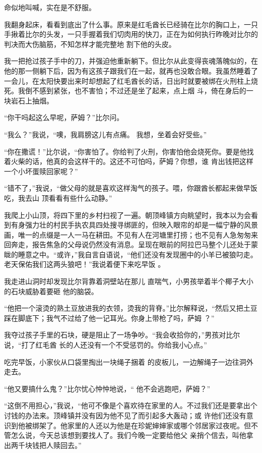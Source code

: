 \documentclass{article}
\begin{document}
命似地叫喊，实在是不舒服。 

我翻身起床，看看到底出了什么事。原来是红毛酋长已经骑在比尔的胸口上，一只手揪着比尔的头发，一只手握着我们切肉用的快刀，正在为如何执行昨晚对比尔的判决而大伤脑筋，不知怎样才能完整地
割下他的头皮。 

我一把抢过孩子手中的刀，并强迫他重新躺下。但比尔从此变得丧魂落魄似的，在他的那一侧躺下后，因为有这孩子跟我们在一起，就再也没敢合眼。我虽然睡着了一会儿，在太阳快要出来时却想起了红毛酋长的话，日出时就要被绑在火刑柱上烧死。我倒不感到紧张，也不害怕；不过还是坐了起来，点上烟
斗，倚在身后的一块岩石上抽烟。 


“你干吗起这么早呢，萨姆？”比尔问。 

“我么？”我说，“噢，我肩膀这儿有点痛。
我想，坐着会好受些。” 

\newpage

“你在撒谎！”比尔说，“你害怕了。你给判了火刑，你害怕他会烧死你。要是他找着火柴的话，他真的会这样干的。这还不可怕吗，萨姆？你想，谁
肯出钱把这样一个小坏蛋赎回家呢？” 

“错不了，”我说，“做父母的就是喜欢这样淘气的孩子。喂，你跟酋长都起来做早饭吃，我去山
顶看看有些什么动静。” 

我爬上小山顶，将四下里的乡村扫视了一遍。朝顶峰镇方向眺望时，我本以为会看到有身强力壮的村民手执农具四处搜寻绑匪的，但映入眼帘的却是一幅宁静的风景画，唯一的点缀是一人一马在耕田。不见有人在河塘里打捞；也不见有人急匆匆来回奔走，报告焦急的父母说仍然没有消息。呈现在眼前的阿拉巴马整个儿还处于蒙眬的睡意之中。“或许，”我自言自语说，“他们还没有发现圈中的小羊已被狼叼走。老天保佑我们这两头狼吧！”我说着便下来吃早饭
。 

我走进山洞时却发现比尔背靠着洞壁站在那儿
\newpage
直喘气，小男孩举着半个椰子大小的石块威胁着要砸
他的脑袋。 

“他把一个滚烫的熟土豆放进我的衣领，烫我的背脊。”比尔解释说，“然后又把土豆踩在脚底下；我气不过给了他一记耳光。你身上带枪了吗，萨姆
？” 

我夺过孩子手里的石块，硬是阻止了一场争吵。“我会收拾你的，”男孩对比尔说，“打了红毛酋
长的人还没有一个不受惩罚的。你给我小心点。” 

吃完早饭，小家伙从口袋里掏出一块绳子捆着
的皮板儿，一边解绳子一边往洞外走去。 

“他又要搞什么鬼？”比尔忧心忡忡地说，“
他不会逃跑吧，萨姆？” 

“这倒不用担心，”我说，“他可不像是个喜欢待在家里的人。不过我们还是要拿出个讨钱的办法来。顶峰镇并没有因为他不见了而引起多大轰动；或
\newpage
许他们还没有意识到他被绑架了。他家里的人还以为他是在珍妮婶婶家或哪个邻居家过夜呢。但不管怎么说，今天总该想到要找人了。我们今晚一定要给他父
亲捎个信去，叫他拿出两千块钱把人赎回去。” 
\end{document}
